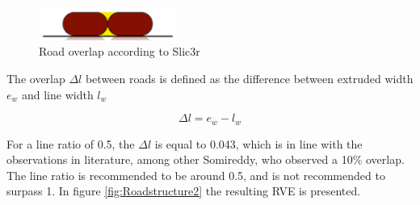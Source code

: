 \begin{figure}[H]
    \centering
    \includegraphics[width=0.40\textwidth]{chapter_4_RVE_Definition/figures/Roadoverlapslic3r.PNG}
    \caption{Road overlap according to Slic3r \cite{GaryHodgsonSlic3rMath}}
    \label{fig:Roadoverlapslic3r}
\end{figure}
The overlap $\Delta l$ between roads is defined as the difference between extruded width $e_w$ and line width $l_w$

\begin{equation} \label{eqn:overlap}
\Delta l=e_w-l_w
\end{equation}




For a line ratio of 0.5, the $\Delta l$ is equal to 0.043, which is in line with the observations in literature, among other Somireddy, who observed a 10\% overlap. The line ratio is recommended to be around 0.5, and is not recommended to surpass 1.  In figure \ref{fig:Roadstructure2} the resulting RVE is presented.

